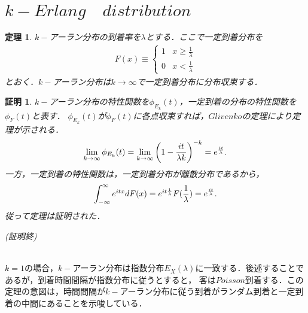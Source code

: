\documentclass[a4j,papersize,disablejfam,slide,14pt]{jsarticle}
\newtheorem{Prop}{定理}
\newtheorem{Proof}{証明}
\def\qed{{\begin{flushright} (証明終) \end{flushright}}} %
\def\exp#1{\mbox{$ e^{#1} $}} %
\begin{document}
\section{$k-Erlang\quad distribution$}
	\begin{screen}
    	\begin{Prop}
        	$k-$アーラン分布の到着率を$\lambda$とする．ここで一定到着分布を
            \begin{eqnarray}
            	F(x) \equiv
                \begin{cases}
                	1 & \text{$x \geq \frac{1}{\lambda}$}\\
                    0 & \text{$x < \frac{1}{\lambda}$}
                \end{cases}
            \end{eqnarray}
            とおく．$k-$アーラン分布は$k \rightarrow \infty$で一定到着分布に分布収束する．
        \end{Prop}
    \end{screen}
    \begin{Proof}
    	$k-$アーラン分布の特性関数を$\phi_{E_k}(t)$，一定到着の分布の特性関数を$\phi_{F}(t)$と表す．
        $\phi_{E_k}(t)$が$\phi_{F}(t)$に各点収束すれば，$Glivenko$の定理により定理が示される．
        \begin{eqnarray}
        	\lim_{k \to \infty} \phi_{E_k}(t) = \lim_{k \to \infty} \left( 1 - \frac{it}{\lambda k} \right)^{-k} 
            = \exp{\frac{it}{\lambda}}.
        \end{eqnarray}
        一方，一定到着の特性関数は，一定到着分布が離散分布であるから，
        \begin{eqnarray}
        	\int_{-\infty}^{\infty} \exp{itx} dF(x) = \exp{it\frac{1}{\lambda}} F(\frac{1}{\lambda}) = \exp{\frac{it}{\lambda}}.
        \end{eqnarray}
        従って定理は証明された．\qed
    \end{Proof}
    \mbox{}\\
    $k = 1$の場合，$k-$アーラン分布は指数分布$E_X(\lambda)$に一致する．後述することであるが，到着時間間隔が指数分布に従うとすると，
    客は$Poisson$到着する．この定理の意図は，時間間隔が$k-$アーラン分布に従う到着がランダム到着と一定到着の中間にあることを示唆している．
\end{document}
